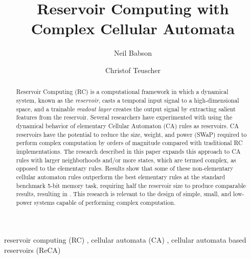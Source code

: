 \documentclass{elsarticle}
\begin{document}
\begin{frontmatter}

\title{Reservoir Computing with Complex Cellular Automata}
\author{Neil Babson} %

\author{Christof Teuscher}
\address{Portland State University, P.O.  Box 751, Portland, OR 97207-0751, 
   USA}
   



\begin{abstract}
Reservoir Computing (RC) is a computational framework in which a dynamical system, 
          known as the \textit{reservoir}, casts a temporal input signal to a 
          high-dimensional space, and a trainable \textit{readout layer} 
          creates the output signal by extracting salient features from the 
          reservoir.
 Several researchers 
have experimented with using the dynamical behavior of elementary Cellular 
Automaton (CA) rules as reservoirs. CA reservoirs have the potential to reduce 
the size, weight, and power (SWaP) required to perform complex computation by 
orders of magnitude compared with traditional RC implementations. The research 
described in this paper expands this approach to CA rules with larger 
neighborhoods and/or more states, which are termed complex, as opposed to the 
elementary rules.  Results show that some of these non-elementary cellular 
automaton rules outperform the best elementary rules at the standard benchmark 
5-bit memory task, requiring half the reservoir size to produce comparable 
results, resulting in . This research is relevant to the design of  simple, 
   small, and low-power systems capable of performing complex computation.

\end{abstract}


\begin{keyword}
reservoir computing (RC) \sep
cellular automata (CA) \sep
cellular automata based reservoirs (ReCA)

\end{keyword}

\end{frontmatter}
\end{document}
